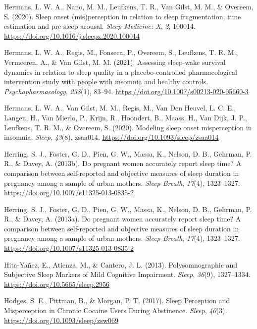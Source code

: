 \documentclass[
]{article}
\newlength{\cslhangindent}
\newenvironment{CSLReferences}[2] %
 {\begin{list}{}{%
  \setlength{\itemindent}{0pt}
  \setlength{\leftmargin}{0pt}
  \setlength{\parsep}{0pt}
  \ifodd #1
   \setlength{\leftmargin}{\cslhangindent}
   \setlength{\itemindent}{-1\cslhangindent}
  \fi
  \setlength{\itemsep}{#2\baselineskip}}}
 {\end{list}}
\begin{document}
\begin{CSLReferences}{1}{0}
Hermans, L. W. A., Nano, M. M., Leufkens, T. R., Van Gilst, M. M., \& Overeem, S. (2020). Sleep onset (mis)perception in relation to sleep fragmentation, time estimation and pre-sleep arousal. \emph{Sleep Medicine: X}, \emph{2}, 100014. \url{https://doi.org/10.1016/j.sleepx.2020.100014}

Hermans, L. W. A., Regis, M., Fonseca, P., Overeem, S., Leufkens, T. R. M., Vermeeren, A., \& Van Gilst, M. M. (2021). Assessing sleep-wake survival dynamics in relation to sleep quality in a placebo-controlled pharmacological intervention study with people with insomnia and healthy controls. \emph{Psychopharmacology}, \emph{238}(1), 83--94. \url{https://doi.org/10.1007/s00213-020-05660-3}

Hermans, L. W. A., Van Gilst, M. M., Regis, M., Van Den Heuvel, L. C. E., Langen, H., Van Mierlo, P., Krijn, R., Hoondert, B., Maass, H., Van Dijk, J. P., Leufkens, T. R. M., \& Overeem, S. (2020). Modeling sleep onset misperception in insomnia. \emph{Sleep}, \emph{43}(8), zsaa014. \url{https://doi.org/10.1093/sleep/zsaa014}

Herring, S. J., Foster, G. D., Pien, G. W., Massa, K., Nelson, D. B., Gehrman, P. R., \& Davey, A. (2013b). Do pregnant women accurately report sleep time? {A} comparison between self-reported and objective measures of sleep duration in pregnancy among a sample of urban mothers. \emph{Sleep Breath}, \emph{17}(4), 1323--1327. \url{https://doi.org/10.1007/s11325-013-0835-2}

Herring, S. J., Foster, G. D., Pien, G. W., Massa, K., Nelson, D. B., Gehrman, P. R., \& Davey, A. (2013a). Do pregnant women accurately report sleep time? {A} comparison between self-reported and objective measures of sleep duration in pregnancy among a sample of urban mothers. \emph{Sleep Breath}, \emph{17}(4), 1323--1327. \url{https://doi.org/10.1007/s11325-013-0835-2}

Hita-Yañez, E., Atienza, M., \& Cantero, J. L. (2013). Polysomnographic and {Subjective} {Sleep} {Markers} of {Mild} {Cognitive} {Impairment}. \emph{Sleep}, \emph{36}(9), 1327--1334. \url{https://doi.org/10.5665/sleep.2956}

Hodges, S. E., Pittman, B., \& Morgan, P. T. (2017). Sleep {Perception} and {Misperception} in {Chronic} {Cocaine} {Users} {During} {Abstinence}. \emph{Sleep}, \emph{40}(3). \url{https://doi.org/10.1093/sleep/zsw069}


\end{CSLReferences}
\end{document}
